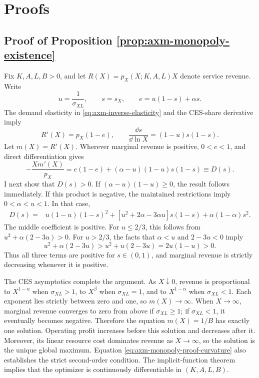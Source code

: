 \section{Proofs}

\subsection{Proof of Proposition \ref{prop:axm-monopoly-existence}}

Fix \(K,A,L,B>0\), and let
\(R(X)=p_X(X;K,A,L)X\) denote service revenue. Write
\[
 u=\frac{1}{\sigma_{XL}},\qquad s=s_X,\qquad
 e=u(1-s)+\alpha s.
\]
The demand elasticity in \eqref{eq:axm-inverse-elasticity} and the CES-share
derivative imply
\[
 R'(X)=p_X(1-e),\qquad
 \frac{\dd s}{\dd\ln X}=(1-u)s(1-s).
\]
Let \(m(X)=R'(X)\). Wherever marginal revenue is positive, \(0<e<1\), and
direct differentiation gives
\begin{equation}
 -\frac{Xm'(X)}{p_X}
 =e(1-e)+(\alpha-u)(1-u)s(1-s)\equiv D(s).
 \label{eq:axm-monopoly-proof-curvature}
\end{equation}
I next show that \(D(s)>0\). If
\((\alpha-u)(1-u)\geq0\), the result follows immediately. If this product is
negative, the maintained restrictions imply \(0<\alpha<u<1\). In that case,
\begin{align*}
 D(s)={}&u(1-u)(1-s)^2
 +[u^2+2\alpha-3\alpha u]s(1-s)
 +\alpha(1-\alpha)s^2.
\end{align*}
The middle coefficient is positive. For \(u\leq2/3\), this follows from
\(u^2+\alpha(2-3u)>0\). For \(u>2/3\), the facts that \(\alpha<u\) and
\(2-3u<0\) imply
\[
 u^2+\alpha(2-3u)>u^2+u(2-3u)=2u(1-u)>0.
\]
Thus all three terms are positive for \(s\in(0,1)\), and marginal revenue is
strictly decreasing whenever it is positive.

The CES asymptotics complete the argument. As \(X\downarrow0\), revenue is
proportional to \(X^{1-u}\) when \(\sigma_{XL}>1\), to \(X^\beta\) when
\(\sigma_{XL}=1\), and to \(X^{1-\alpha}\) when \(\sigma_{XL}<1\). Each
exponent lies strictly between zero and one, so \(m(X)\to\infty\). When
\(X\to\infty\), marginal revenue converges to zero from above if
\(\sigma_{XL}\geq1\); if \(\sigma_{XL}<1\), it eventually becomes negative.
Therefore the equation \(m(X)=1/B\) has exactly one solution. Operating profit
increases before this solution and decreases after it. Moreover, its linear
resource cost dominates revenue as \(X\to\infty\), so the solution is the unique
global maximum. Equation \eqref{eq:axm-monopoly-proof-curvature} also establishes
the strict second-order condition. The implicit-function theorem implies that
the optimizer is continuously differentiable in \((K,A,L,B)\).

